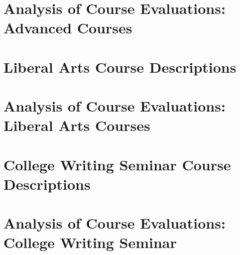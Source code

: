 \documentclass[../../main.tex]{subfiles}
\begin{document}
\section{Analysis of Course Evaluations: Advanced Courses}
\label{sec:adv_eval}

\begin{flushleft}

\end{flushleft}

\section{Liberal Arts Course Descriptions}
\label{sec:lib}

\begin{flushleft}

\end{flushleft}

\section{Analysis of Course Evaluations: Liberal Arts Courses}
\label{sec:lib_eval}

\begin{flushleft}

\end{flushleft}

\section{College Writing Seminar Course Descriptions}
\label{sec:writing}

\begin{flushleft}

\end{flushleft}

\section{Analysis of Course Evaluations: College Writing Seminar}
\label{sec:writing_eval}

\begin{flushleft}

\end{flushleft}
\end{document}
